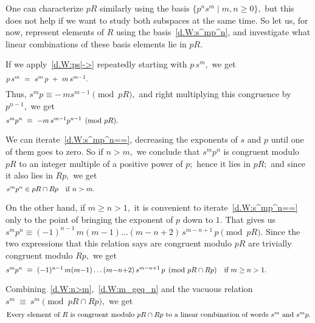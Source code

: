 \documentclass{amsart}
\begin{document}
One can characterize $pR$ similarly using the basis
$\{p^n s^m\mid m,n\geq 0\},$ but this does not help if we want to
study both subspaces at the same time.
So let us,
for now, represent elements of $R$ using the basis~\eqref{d.W:s^mp^n},
and investigate what linear combinations of these
basis elements lie in $pR.$

If we apply~\eqref{d.W:ps|->} repeatedly starting with $p\,s^m,$ we get
\begin{equation}\begin{minipage}[c]{35pc}\label{d.W:ps^m}
$p\,s^m\ =\ s^m\,p\ +\ m\,s^{m-1}.$
\end{minipage}\end{equation}
Thus, $s^m p\equiv -\,m s^{m-1}\pmod{pR},$ and right multiplying
this congruence by $p^{n-1},$ we get
\begin{equation}\begin{minipage}[c]{35pc}\label{d.W:s^mp^n==}
$s^m p^n\ \equiv\ -m\,s^{m-1}p^{n-1}\pmod{pR}.$
\end{minipage}\end{equation}

We can iterate~\eqref{d.W:s^mp^n==}, decreasing the exponents
of $s$ and $p$ until one of them goes to zero.
So if $n>m,$ we conclude that $s^m p^n$ is congruent
modulo $pR$ to an integer multiple of a positive power of $p;$
hence it lies in $pR;$ and since it also lies in $Rp,$ we get
\begin{equation}\begin{minipage}[c]{35pc}\label{d.W:n>m}
$s^m p^n\in pR\cap Rp$\quad if $n>m.$
\end{minipage}\end{equation}

On the other hand, if $m\geq n > 1,$ it is convenient to
iterate~\eqref{d.W:s^mp^n==} only to the point of bringing
the exponent of $p$ down to $1.$
That gives us
$s^m p^n\equiv (-1)^{n-1}\,m(m-1)\dots(m-n+2)\,s^{m-n+1}\,p\pmod{pR}.$
Since the two expressions that this relation says are congruent
modulo $pR$ are trivially congruent modulo $Rp,$ we get
\begin{equation}\begin{minipage}[c]{35pc}\label{d.W:m_geq_n}
$s^m p^n\ \equiv\ (-1)^{n-1}\,m(m{-}1)\dots(m{-}n{+}2)\,s^{m-n+1}\,p
\pmod{pR\cap Rp}$\quad if $m\geq n > 1.$
\end{minipage}\end{equation}

Combining~\eqref{d.W:n>m},~\eqref{d.W:m_geq_n} and the
vacuous relation $s^m\ \equiv\ s^m \pmod{pR\cap Rp},$ we get
\begin{equation}\begin{minipage}[c]{35pc}\label{d.W:pR+Rp_big}
Every element of $R$ is congruent modulo $pR\cap Rp$ to
a linear combination of words $s^m$ and~$s^m p.$
\end{minipage}\end{equation}
\end{document}
